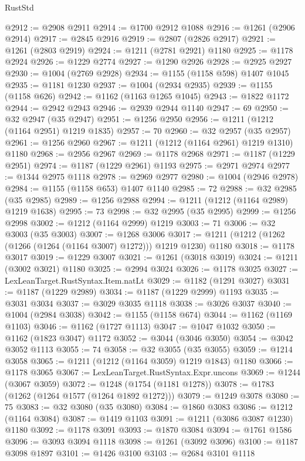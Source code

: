 \begin{lexlean}{RustStd}
\begin{coremodule}
@2912 := @2908 @2911
@2914 := @1700 @2912 @1088
@2916 := @1261 (@2906 @2914)
@2917 := @2845 @2916
@2919 := @2807 (@2826 @2917)
@2921 := @1261 (@2803 @2919)
@2924 := @1211 (@2781 @2921) @1180
@2925 := @1178 @2924
@2926 := @1229 @2774
@2927 := @1290 @2926
@2928 := @2925 @2927
@2930 := @1004 (@2769 @2928)
@2934 := @1155 (@1158 @598) @1407 @1045
@2935 := @1181 @1230
@2937 := @1004 (@2934 @2935)
@2939 := @1155 (@1158 @626)
@2942 := @1162 (@1163 @1265 @1045)
@2943 := @1822 @1172
@2944 := @2942 @2943
@2946 := @2939 @2944 @1140
@2947 := 69
@2950 := @32 @2947 (@35 @2947)
@2951 := @1256 @2950
@2956 := @1211 (@1212 (@1164 @2951) @1219 @1835)
@2957 := 70
@2960 := @32 @2957 (@35 @2957)
@2961 := @1256 @2960
@2967 := @1211 (@1212 (@1164 @2961) @1219 @1310) @1180
@2968 := @2956 @2967
@2969 := @1178 @2968
@2971 := @1187 (@1229 @2951)
@2974 := @1187 (@1229 @2961) @1193
@2975 := @2971 @2974
@2977 := @1344 @2975 @1118
@2978 := @2969 @2977
@2980 := @1004 (@2946 @2978)
@2984 := @1155 (@1158 @653) @1407 @1140
@2985 := 72
@2988 := @32 @2985 (@35 @2985)
@2989 := @1256 @2988
@2994 := @1211 (@1212 (@1164 @2989) @1219 @1638)
@2995 := 73
@2998 := @32 @2995 (@35 @2995)
@2999 := @1256 @2998
@3002 := @1212 (@1164 @2999) @1219
@3003 := 71
@3006 := @32 @3003 (@35 @3003)
@3007 := @1268 @3006
@3017 := @1211 (@1212 (@1262 (@1266 (@1264 (@1164 @3007) @1272))) @1219 @1230) @1180
@3018 := @1178 @3017
@3019 := @1229 @3007
@3021 := @1261 (@3018 @3019)
@3024 := @1211 (@3002 @3021) @1180
@3025 := @2994 @3024
@3026 := @1178 @3025
@3027 := LexLeanTarget.RustSyntax.Item.natLt
@3029 := @1182 (@1291 @3027)
@3031 := @1187 (@1229 @2989)
@3034 := @1187 (@1229 @2999) @1193
@3035 := @3031 @3034
@3037 := @3029 @3035 @1118
@3038 := @3026 @3037
@3040 := @1004 (@2984 @3038)
@3042 := @1155 (@1158 @674)
@3044 := @1162 (@1169 @1103)
@3046 := @1162 (@1727 @1113)
@3047 := @1047 @1032
@3050 := @1162 (@1823 @3047) @1172
@3052 := @3044 (@3046 @3050)
@3054 := @3042 @3052 @1113
@3055 := 74
@3058 := @32 @3055 (@35 @3055)
@3059 := @1214 @3058
@3065 := @1211 (@1212 (@1164 @3059) @1219 @1843) @1180
@3066 := @1178 @3065
@3067 := LexLeanTarget.RustSyntax.Expr.uncons
@3069 := @1244 (@3067 @3059)
@3072 := @1248 (@1754 (@1181 @1278))
@3078 := @1783 (@1262 (@1264 @1577 (@1264 @1892 @1272)))
@3079 := @1249 @3078
@3080 := 75
@3083 := @32 @3080 (@35 @3080)
@3084 := @1860 @3083
@3086 := @1212 (@1164 @3084)
@3087 := @1419 @1103
@3091 := @1211 (@3086 @3087 @1230) @1180
@3092 := @1178 @3091
@3093 := @1870 @3084
@3094 := @1761 @1586
@3096 := @3093 @3094 @1118
@3098 := @1261 (@3092 @3096)
@3100 := @1187 @3098 @1897
@3101 := @1426 @3100
@3103 := @2684 @3101 @1118

\end{coremodule}
\end{lexlean}
